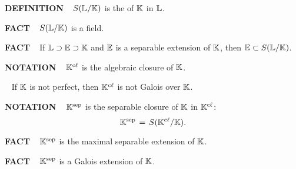 \vspace{0.1cm}

\begin{x}{\small\bf DEFINITION} \ %
$S(\mathbb{L}/\mathbb{K})$ is the 
of $\mathbb{K}$ in $\mathbb{L}$.
\end{x}

\vspace{0.1cm}

\begin{x}{\small\bf FACT} \ %
$S(\mathbb{L}/\mathbb{K})$ is a field.
\end{x}

\vspace{0.1cm}

\begin{x}{\small\bf FACT} \ %
If $\mathbb{L} \supset \mathbb{E} \supset \mathbb{K}$ and $\mathbb{E}$ is a separable extension of $\mathbb{K}$, then $\mathbb{E} \subset S(\mathbb{L}/\mathbb{K})$.
\end{x}

\vspace{0.1cm}

\begin{x}{\small\bf NOTATION} \ %
$\mathbb{K}^{\text{c$\ell$}}$ is the algebraic closure of $\mathbb{K}$.
\end{x}

\vspace{0.1cm}

\begin{x}{\small\bf {}} \ %
If $\mathbb{K}$ is not perfect, then $\mathbb{K}^{\text{c$\ell$}}$ is not Galois over $\mathbb{K}$.
\end{x}

\vspace{0.1cm}

\begin{x}{\small\bf NOTATION}  \ %
$\mathbb{K}^{\text{sep}}$ is the separable closure of $\mathbb{K}$ in $\mathbb{K}^{\text{c$\ell$}}$:
\[
\mathbb{K}^{\text{sep}} \hspace{0.05cm} = \hspace{0.05cm} S(\mathbb{K}^{\text{c$\ell$}}/\mathbb{K}).
\]
\end{x}

\vspace{0.1cm}

\begin{x}{\small\bf FACT} \ %
$\mathbb{K}^{\text{sep}}$ is the maximal separable extension of $\mathbb{K}$.
\end{x}

\begin{x}{\small\bf FACT} \ %
$\mathbb{K}^{\text{sep}}$ is a Galois extension of $\mathbb{K}$.
\end{x}

\vspace{0.1cm}

